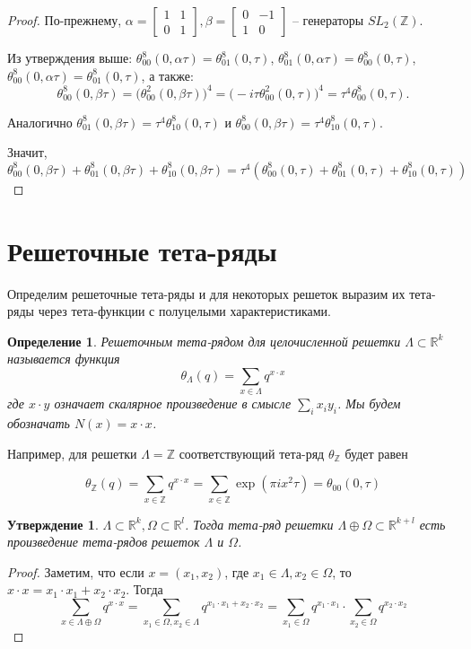 \documentclass{article}
\newcommand{\ZZ}{\mathbb{Z}}
\newcommand{\RR}{\mathbb{R}}
\theoremstyle{break}
\newtheorem{definition}[theorem]{Определение}
\newtheorem{claim}{Утверждение}[section]
\begin{document}
\begin{proof}
	
	По-прежнему, $\alpha=\begin{bmatrix}
		1 & 1 \\ 0 & 1
	\end{bmatrix}, \beta=\begin{bmatrix}
		0 & -1 \\ 1 & 0
	\end{bmatrix}$ -- генераторы $SL_2(\ZZ)$.

	Из утверждения выше: 
	$\theta_{00}^8(0, \alpha\tau)=\theta_{01}^8(0, \tau)$, 
	$\theta_{01}^8(0, \alpha\tau)=\theta_{00}^8(0, \tau)$,
	$\theta_{00}^8(0, \alpha\tau)=\theta_{01}^8(0, \tau)$, 
	а также:
	$$
	\theta_{00}^8(0, \beta \tau)=
	\Big( \theta_{00}^2(0, \beta \tau) \Big)^4=
	\Big( -i\tau\theta_{00}^2(0, \tau) \Big)^4=
	\tau^4\theta_{00}^8(0, \tau).
	$$
	
	Аналогично $\theta_{01}^8(0, \beta\tau)=\tau^4\theta_{10}^8(0, \tau)$ и
	$\theta_{00}^8(0, \beta \tau)=\tau^4\theta_{10}^8(0, \tau)$.

	Значит,
	$$
	\theta_{00}^8(0, \beta \tau) 
	+ \theta_{01}^8(0, \beta \tau)
	+ \theta_{10}^8(0, \beta \tau)=
	\tau^4(\theta_{00}^8(0, \tau) + \theta_{01}^8(0, \tau) + \theta_{10}^8(0, \tau))
	$$
	
\end{proof}

\section{Решеточные тета-ряды}
Определим решеточные тета-ряды и для некоторых решеток выразим их тета-ряды через 
тета-функции с полуцелыми характеристиками.
\begin{definition}
	Решеточным тета-рядом для целочисленной решетки $\Lambda \subset \RR^k$ называется функция
	$$
		\theta_{\Lambda}(q)=\sum_{x \in \Lambda} q^{x \cdot x}
	$$
	где $x \cdot y$ означает скалярное произведение в смысле $\sum_{i} x_i y_i$. 
	Мы будем обозначать $N(x) = x \cdot x$.
\end{definition}

Например, для решетки $\Lambda=\ZZ$ соответствующий тета-ряд $\theta_\ZZ$ будет равен

$$
	\theta_{\ZZ}(q) = \sum_{x \in \ZZ} q^{x \cdot x} = 
	\sum_{x \in \ZZ} \exp(\pi i x^2 \tau) = \theta_{00}(0, \tau)
$$


\begin{claim}
	$\Lambda \subset \RR^k, \Omega \subset \RR^l$. Тогда тета-ряд решетки 
	$\Lambda \oplus \Omega \subset \RR^{k + l}$ есть произведение тета-рядов
	решеток $\Lambda$ и $\Omega$.
\end{claim}
\begin{proof}
	Заметим, что если $x = (x_1, x_2)$, где $x_1 \in \Lambda, x_2 \in \Omega$, то 
	$x \cdot x = x_1 \cdot x_1 + x_2 \cdot x_2$. Тогда 
	$$
		\sum_{x \in \Lambda \oplus \Omega} q ^ {x \cdot x}
		= \sum_{x_1 \in \Omega, x_2 \in \Lambda} q ^ {x_1 \cdot x_1 + x_2 \cdot x_2}
		= \sum_{x_1 \in \Omega} q ^ {x_1 \cdot x_1} \cdot 
		\sum_{x_2 \in \Omega} q ^ {x_2 \cdot x_2}
	$$
\end{proof}
\end{document}
